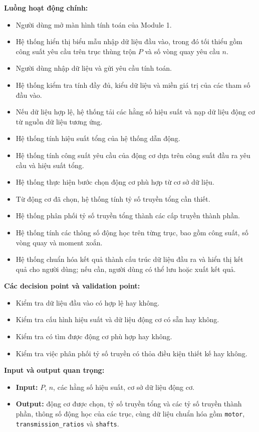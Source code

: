 \documentclass[a4paper]{article}
\begin{document}
\textbf{Luồng hoạt động chính:}
\begin{itemize}
\item Người dùng mở màn hình tính toán của Module 1.
\item Hệ thống hiển thị biểu mẫu nhập dữ liệu đầu vào, trong đó tối thiểu gồm công suất yêu cầu trên trục thùng trộn \(P\) và số vòng quay yêu cầu \(n\).
\item Người dùng nhập dữ liệu và gửi yêu cầu tính toán.
\item Hệ thống kiểm tra tính đầy đủ, kiểu dữ liệu và miền giá trị của các tham số đầu vào.
\item Nếu dữ liệu hợp lệ, hệ thống tải các hằng số hiệu suất và nạp dữ liệu động cơ từ nguồn dữ liệu tương ứng.
\item Hệ thống tính hiệu suất tổng của hệ thống dẫn động.
\item Hệ thống tính công suất yêu cầu của động cơ dựa trên công suất đầu ra yêu cầu và hiệu suất tổng.
\item Hệ thống thực hiện bước chọn động cơ phù hợp từ cơ sở dữ liệu.
\item Từ động cơ đã chọn, hệ thống tính tỷ số truyền tổng cần thiết.
\item Hệ thống phân phối tỷ số truyền tổng thành các cấp truyền thành phần.
\item Hệ thống tính các thông số động học trên từng trục, bao gồm công suất, số vòng quay và moment xoắn.
\item Hệ thống chuẩn hóa kết quả thành cấu trúc dữ liệu đầu ra và hiển thị kết quả cho người dùng; nếu cần, người dùng có thể lưu hoặc xuất kết quả.
\end{itemize}

\textbf{Các decision point và validation point:}
\begin{itemize}
\item Kiểm tra dữ liệu đầu vào có hợp lệ hay không.
\item Kiểm tra cấu hình hiệu suất và dữ liệu động cơ có sẵn hay không.
\item Kiểm tra có tìm được động cơ phù hợp hay không.
\item Kiểm tra việc phân phối tỷ số truyền có thỏa điều kiện thiết kế hay không.
\end{itemize}

\textbf{Input và output quan trọng:}
\begin{itemize}
\item \textbf{Input:} \(P\), \(n\), các hằng số hiệu suất, cơ sở dữ liệu động cơ.
\item \textbf{Output:} động cơ được chọn, tỷ số truyền tổng và các tỷ số truyền thành phần, thông số động học của các trục, cùng dữ liệu chuẩn hóa gồm \texttt{motor}, \texttt{transmission\_ratios} và \texttt{shafts}.
\end{itemize}
\end{document}
